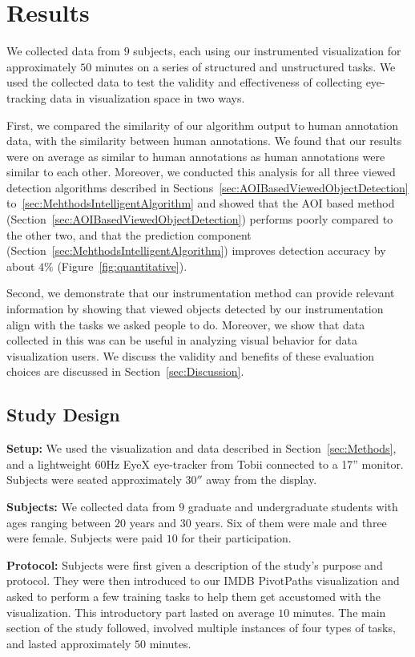 \section{Results}
\label{sec:Evaluation}
We collected data from $9$ subjects, each using our instrumented visualization for approximately $50$ minutes on a series of structured and unstructured tasks. We used the collected data to test the validity and effectiveness of collecting eye-tracking data in visualization space in two ways. 

First, we compared the similarity of our algorithm output to human annotation data, with the similarity between human annotations. We found that our results were on average as similar to human annotations as human annotations were similar to each other. Moreover, we conducted this analysis for all three viewed detection algorithms described in Sections~\ref{sec:AOIBasedViewedObjectDetection} to~\ref{sec:MehthodsIntelligentAlgorithm} and showed that the AOI based method (Section~\ref{sec:AOIBasedViewedObjectDetection}) performs poorly compared to the other two, and that the prediction component (Section~\ref{sec:MehthodsIntelligentAlgorithm}) improves detection accuracy by about $4\%$  (Figure~\ref{fig:quantitative}). 

Second, we demonstrate that our instrumentation method can provide relevant information by showing that viewed objects detected by our instrumentation align with the tasks we asked people to do. Moreover, we show that data collected in this was can be useful in analyzing visual behavior for data visualization users.  
We discuss the validity and benefits of these evaluation choices are discussed in Section~\ref{sec:Discussion}.

\subsection{Study Design }
\label{sec:EvalStudyDesign}

\textbf{Setup: } We used the visualization and data described in Section~\ref{sec:Methods}, and a lightweight $60$Hz EyeX eye-tracker from Tobii connected to a 17'' monitor. Subjects were seated approximately $30''$ away from the display. 

\textbf{Subjects:} We collected data from $9$ graduate and undergraduate students with ages ranging between $20$ years and $30$ years. Six of them were male and three were female. Subjects were paid $10$ for their participation. 

\textbf{Protocol:} Subjects were first given a description of the study's purpose and protocol. They were then introduced to our IMDB PivotPaths visualization and asked to perform a few training tasks to help them get accustomed with the visualization. This introductory part lasted on average $10$ minutes. The main section of the study followed, involved multiple instances of four types of tasks, and lasted approximately $50$ minutes. 



